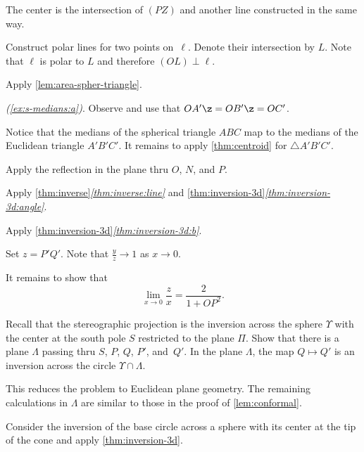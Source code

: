 The center is the intersection of $(PZ)$ and another line constructed in the same way.

Construct polar lines for two points on~$\ell$.
Denote their intersection by $L$.
Note that $\ell$ is polar to $L$ and therefore $(OL)\perp \ell$.

\setcounter{eqtn}{0}

Apply \ref{lem:area-spher-triangle}.

\textit{(\ref{ex:s-medians:a})}.
Observe and use that 
$OA'\z=OB'\z=OC'$.

Notice that the medians of the spherical triangle $ABC$
map to the medians of the Euclidean triangle $A'B'C'$.
It remains to apply \ref{thm:centroid} for $\triangle A'B'C'$.

Apply the reflection in the plane thru $O$, $N$, and $P$.

Apply \ref{thm:inverse}\textit{\ref{thm:inverse:line}}
and \ref{thm:inversion-3d}\textit{\ref{thm:inversion-3d:angle}}.

Apply \ref{thm:inversion-3d}\textit{\ref{thm:inversion-3d:b}}.

Set $z=P'Q'$.
Note that $\tfrac yz\to 1$ as $x\to 0$.

It remains to show that 
$$\lim_{x\to 0} \frac{z}{x}=\frac{2}{1+OP^2}.$$

Recall that the stereographic projection is the inversion across the sphere $\Upsilon$ with the center at the south pole $S$ restricted to the plane $\Pi$.
Show that there is a plane $\Lambda$ passing thru $S$, $P$, $Q$, $P'$, and~$Q'$.
In the plane $\Lambda$, the map $Q\mapsto Q'$ is an inversion across the circle $\Upsilon\cap \Lambda$.

This reduces the problem to Euclidean plane geometry.
The remaining calculations in $\Lambda$ are similar to those in the proof of \ref{lem:conformal}.

Consider the inversion of the base circle across a sphere with its center at the tip of the cone and apply \ref{thm:inversion-3d}.



